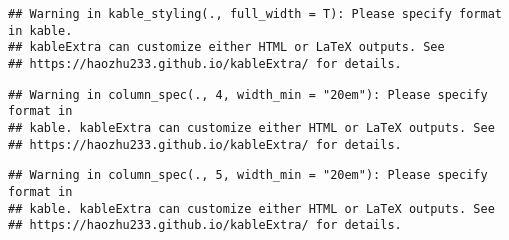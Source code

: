 \documentclass[
]{book}
\begin{document}
\begin{verbatim}
## Warning in kable_styling(., full_width = T): Please specify format in kable.
## kableExtra can customize either HTML or LaTeX outputs. See
## https://haozhu233.github.io/kableExtra/ for details.
\end{verbatim}

\begin{verbatim}
## Warning in column_spec(., 4, width_min = "20em"): Please specify format in
## kable. kableExtra can customize either HTML or LaTeX outputs. See
## https://haozhu233.github.io/kableExtra/ for details.
\end{verbatim}

\begin{verbatim}
## Warning in column_spec(., 5, width_min = "20em"): Please specify format in
## kable. kableExtra can customize either HTML or LaTeX outputs. See
## https://haozhu233.github.io/kableExtra/ for details.
\end{verbatim}
\end{document}
